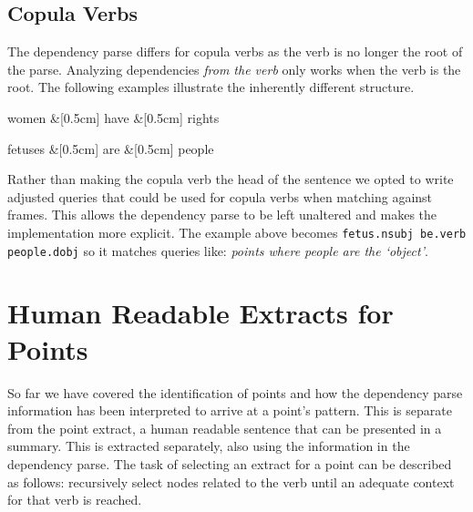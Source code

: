     \tocless\subsection{Copula Verbs}
      The dependency parse differs for copula verbs as the verb is no longer the root of the parse. Analyzing dependencies \textit{from the verb} only works when the verb is the root. The following examples illustrate the inherently different structure.
      \begin{multicols}{2}
        \raggedcolumns
        \begin{center}
          \begin{dependency}[edge horizontal padding=0]
            \begin{deptext}
              women \&[0.5cm] have \&[0.5cm] rights \\
            \end{deptext}
          \end{dependency}
        \end{center}
        \columnbreak
        \begin{center}
          \begin{dependency}[edge horizontal padding=0]
            \begin{deptext}
              fetuses \&[0.5cm] are \&[0.5cm] people \\
            \end{deptext}
          \end{dependency}
        \end{center}
      \end{multicols}

      Rather than making the copula verb the head of the sentence we opted to write adjusted queries that could be used for copula verbs when matching against frames. This allows the dependency parse to be left unaltered and makes the implementation more explicit. The example above becomes \texttt{fetus.nsubj be.verb people.dobj} so it matches queries like: \textit{points where people are the `object'}.

  \section{Human Readable Extracts for Points}
    So far we have covered the identification of points and how the dependency parse information has been interpreted to arrive at a point's pattern. This is separate from the point extract, a human readable sentence that can be presented in a summary. This is extracted separately, also using the information in the dependency parse. The task of selecting an extract for a point can be described as follows: recursively select nodes related to the verb until an adequate context for that verb is reached.

